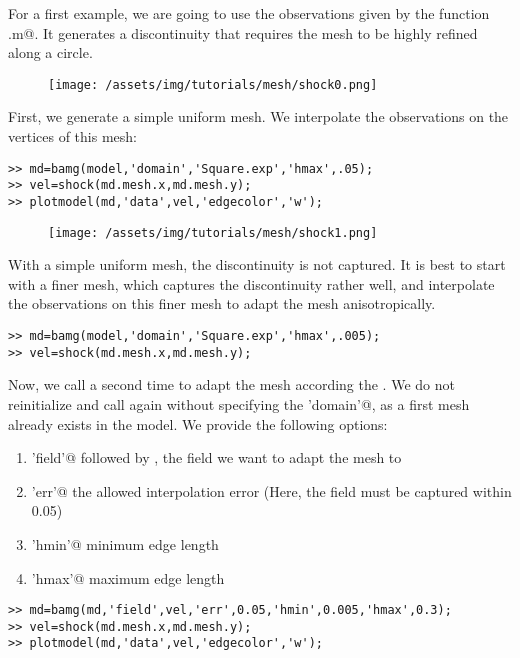 For a first example, we are going to use the observations given by the function \verb@shock.m@. It generates a discontinuity that requires the mesh to be highly refined along a circle.
\begin{figure}[H]
	\begin{center}
		\texttt{[image: /assets/img/tutorials/mesh/shock0.png]}
	\end{center}
\end{figure}
First, we generate a simple uniform mesh. We interpolate the observations on the vertices of this mesh:
\begin{verbatim}>> md=bamg(model,'domain','Square.exp','hmax',.05);
>> vel=shock(md.mesh.x,md.mesh.y);
>> plotmodel(md,'data',vel,'edgecolor','w');
\end{verbatim}
\begin{figure}[H]
	\begin{center}
		\texttt{[image: /assets/img/tutorials/mesh/shock1.png]}
	\end{center}
\end{figure}
With a simple uniform mesh, the discontinuity is not captured. It is best to start with a finer mesh, which captures the discontinuity rather well, and interpolate the observations on this finer mesh to adapt the mesh anisotropically.
\begin{verbatim}>> md=bamg(model,'domain','Square.exp','hmax',.005);
>> vel=shock(md.mesh.x,md.mesh.y);
\end{verbatim}
Now, we call \verb@bamg@ a second time to adapt the mesh according the \verb@vel@. We do not reinitialize \verb@md@ and call \verb@bamg@ again without specifying the \verb@'domain'@, as a first mesh already exists in the model. We provide the following options:
\begin{enumerate}
	\item \verb@'field'@ followed by \verb@vel@, the field we want to adapt the mesh to
	\item \verb@'err'@ the allowed interpolation error (Here, the field must be captured within 0.05)
	\item \verb@'hmin'@ minimum edge length
	\item \verb@'hmax'@ maximum edge length
\end{enumerate}
\begin{verbatim}>> md=bamg(md,'field',vel,'err',0.05,'hmin',0.005,'hmax',0.3);
>> vel=shock(md.mesh.x,md.mesh.y);
>> plotmodel(md,'data',vel,'edgecolor','w');
\end{verbatim}

